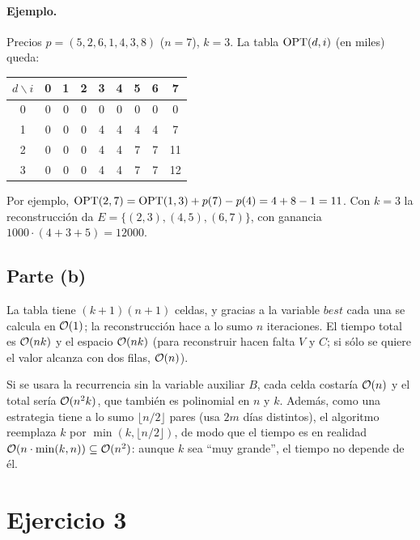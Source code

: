 \paragraph{Ejemplo.} Precios $p=(5,2,6,1,4,3,8)$ ($n=7$), $k=3$. La tabla $\mathrm{OPT}(d,i)$ (en miles) queda:

\begin{center}
\begin{tabular}{c|cccccccc}
$d\backslash i$ & 0 & 1 & 2 & 3 & 4 & 5 & 6 & 7\\ \hline
0 & 0 & 0 & 0 & 0 & 0 & 0 & 0 & 0\\
1 & 0 & 0 & 0 & 4 & 4 & 4 & 4 & 7\\
2 & 0 & 0 & 0 & 4 & 4 & 7 & 7 & 11\\
3 & 0 & 0 & 0 & 4 & 4 & 7 & 7 & 12\\
\end{tabular}
\end{center}

Por ejemplo, $\mathrm{OPT}(2,7)=\mathrm{OPT}(1,3)+p(7)-p(4)=4+8-1=11$. Con $k=3$ la reconstrucción da
$E=\{(2,3),(4,5),(6,7)\}$, con ganancia $1000\cdot(4+3+5)=12000$.

\subsection*{Parte (b)}

La tabla tiene $(k+1)(n+1)$ celdas, y gracias a la variable $best$ cada una se calcula en $\mathcal{O}(1)$; la
reconstrucción hace a lo sumo $n$ iteraciones. El tiempo total es $\mathcal{O}(nk)$ y el espacio $\mathcal{O}(nk)$ (para
reconstruir hacen falta $V$ y $C$; si sólo se quiere el valor alcanza con dos filas, $\mathcal{O}(n)$).

Si se usara la recurrencia sin la variable auxiliar $B$, cada celda costaría $\mathcal{O}(n)$ y el total sería
$\mathcal{O}(n^2k)$, que también es polinomial en $n$ y $k$. Además, como una estrategia tiene a lo sumo
$\lfloor n/2\rfloor$ pares (usa $2m$ días distintos), el algoritmo reemplaza $k$ por
$\min(k,\lfloor n/2\rfloor)$, de modo que el tiempo es en realidad $\mathcal{O}(n\cdot\min(k,n))\subseteq\mathcal{O}(n^2)$:
aunque $k$ sea ``muy grande'', el tiempo no depende de él.

\section{Ejercicio 3}

